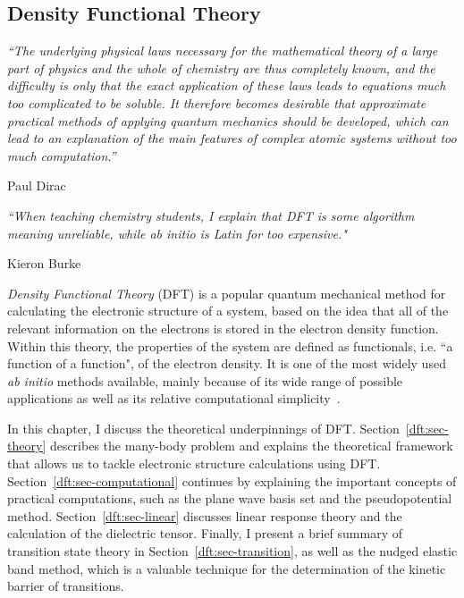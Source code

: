 \begin{refsection} 
 
\chapter{Density Functional Theory} 
 
\setlength{\epigraphwidth}{4in} 
\epigraph{\textit{``The underlying physical laws necessary for the 
mathematical theory of a large part of physics and the whole of chemistry are 
thus completely known, and the difficulty is only that the exact application 
of these laws leads to equations much too complicated to be soluble. It 
therefore becomes desirable that approximate practical methods of applying 
quantum mechanics should be developed, which can lead to an explanation of the 
main features of complex atomic systems without too much computation.''}}{Paul 
Dirac} 
\vspace{2em} 
 
\setlength{\epigraphwidth}{4in} 
\epigraph{\textit{``When teaching chemistry students, I explain that DFT is 
some algorithm meaning unreliable, while ab initio is Latin for too 
expensive."}}{Kieron Burke} 
\vspace{3em} 
 
\textit{Density Functional Theory} (DFT) is a popular quantum mechanical 
method for calculating the electronic structure of a system, based on the idea 
that all of the relevant information on the electrons is stored in the 
electron density function. Within this theory, the properties of the system 
are defined as functionals, i.e. ``a function of a function", of the electron 
density. It is one of the most widely used \textit{ab initio} methods 
available, mainly because of its wide range of possible applications as well 
as its relative computational simplicity~\cite{Martin2004}.  
 
In this chapter, I discuss the theoretical underpinnings of DFT. 
Section~\ref{dft:sec-theory} describes the many-body problem and explains the 
theoretical framework that allows us to tackle electronic structure 
calculations using DFT. Section~\ref{dft:sec-computational} continues by 
explaining the important concepts of practical computations, such as the plane 
wave basis set and the pseudopotential method. 
Section~\ref{dft:sec-linear} discusses 
linear response theory and the calculation of the dielectric tensor. Finally, 
I present a brief summary of transition state theory in 
Section~\ref{dft:sec-transition}, as well as the nudged elastic band method, 
which is a valuable technique for the determination of the kinetic barrier of 
transitions.  
 

\end{refsection}
